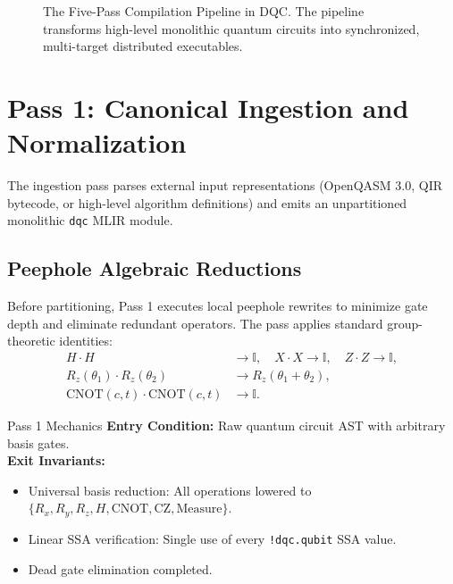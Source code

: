 \begin{figure}[htbp]
    \caption{The Five-Pass Compilation Pipeline in DQC. The pipeline transforms high-level monolithic quantum circuits into synchronized, multi-target distributed executables.}
    \label{fig:five_pass_dataflow}
\end{figure}

\section{Pass 1: Canonical Ingestion and Normalization}
\label{sec:pass1_ingestion}

The ingestion pass parses external input representations (OpenQASM 3.0, QIR bytecode, or high-level algorithm definitions) and emits an unpartitioned monolithic \texttt{dqc} MLIR module.

\subsection{Peephole Algebraic Reductions}
Before partitioning, Pass 1 executes local peephole rewrites to minimize gate depth and eliminate redundant operators. The pass applies standard group-theoretic identities:
\begin{align}
    H \cdot H &\to \mathbb{I}, \quad X \cdot X \to \mathbb{I}, \quad Z \cdot Z \to \mathbb{I}, \\
    R_z(\theta_1) \cdot R_z(\theta_2) &\to R_z(\theta_1 + \theta_2), \\
    \text{CNOT}(c, t) \cdot \text{CNOT}(c, t) &\to \mathbb{I}.
\end{align}

\begin{passbox}{Pass 1 Mechanics}
\textbf{Entry Condition:} Raw quantum circuit AST with arbitrary basis gates.\\
\textbf{Exit Invariants:}
\begin{itemize}
    \item Universal basis reduction: All operations lowered to $\{R_x, R_y, R_z, H, \text{CNOT}, \text{CZ}, \text{Measure}\}$.
    \item Linear SSA verification: Single use of every \texttt{!dqc.qubit} SSA value.
    \item Dead gate elimination completed.
\end{itemize}
\end{passbox}


